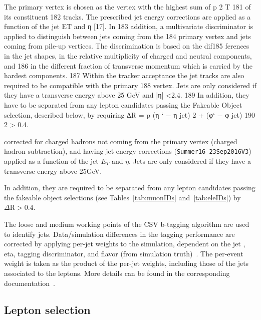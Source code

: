 The primary vertex is chosen as the vertex with the highest sum of p
2
T
181 of its constituent
182 tracks. The prescribed jet energy corrections are applied as a function of the jet ET and η [17]. In
183 addition, a multivariate discriminator is applied to distinguish between jets coming from the
184 primary vertex and jets coming from pile-up vertices. The discrimination is based on the dif185
ferences in the jet shapes, in the relative multiplicity of charged and neutral components, and
186 in the different fraction of transverse momentum which is carried by the hardest components.
187 Within the tracker acceptance the jet tracks are also required to be compatible with the primary
188 vertex. Jets are only considered if they have a transverse energy above 25 GeV and |η| <2.4.
189 In addition, they have to be separated from any lepton candidates passing the Fakeable Object
selection, described below, by requiring ∆R =
p
(η
` − η
jet)
2 + (φ` − φ
jet) 190 2 > 0.4.




corrected for charged hadrons not coming from the primary vertex (charged hadron subtraction), and having jet energy corrections (\verb|Summer16_23Sep2016V3|) applied as a function of the jet $E_T$ and $\eta$. Jets are only considered if they have a transverse energy above $25$GeV.


In addition, they are required to be separated from any lepton candidates passing the fakeable object selections (see Tables~\ref{tab:muonIDs} and~\ref{tab:eleIDs}) by $\Delta\mathrm{R}>0.4$.

The loose and medium working points of the CSV b-tagging algorithm are used to identify \bjet jets. Data/simulation differences in the \bjet tagging performance are corrected by applying per-jet weights to the simulation, dependent on the jet \pt, eta, \bjet tagging discriminator, and flavor (from simulation truth)~\cite{btagRecommTWiki}. The per-event weight is taken as the product of the per-jet weights, including those of the jets associated to the leptons. More details can be found in the corresponding \ttH documentation~\cite{CMS_AN_2016-211,CMS_AN_2017-029}.

\subsection{Lepton selection}

